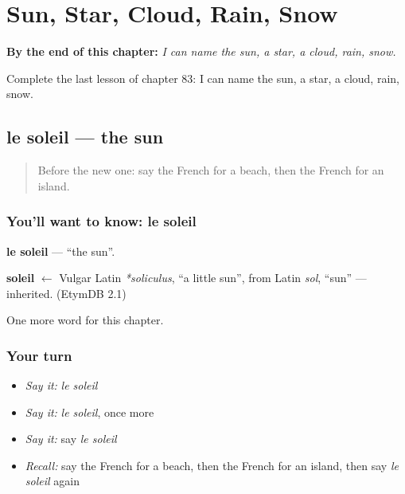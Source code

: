 
\chapter{Sun, Star, Cloud, Rain, Snow}
\label{ch:fr-sun-star-cloud-rain-snow}

\begin{chapteropening}
\textbf{By the end of this chapter:} \emph{I can name the sun, a star, a cloud, rain, snow.}

Complete the last lesson of chapter 83: I can name the sun, a star, a cloud, rain, snow.
\end{chapteropening}

\section[le soleil]{le soleil — the sun}

\label{lesson:FR-C83-soleil}



\begin{quote}
Before the new one: say the French for a beach, then the French for an island.
\end{quote}

\subsection*{You'll want to know: le soleil}
\textbf{le soleil} — \textquotedblleft{}the sun\textquotedblright{}.

\begin{cousinweb}
\textbf{soleil} $\leftarrow$ Vulgar Latin \emph{*soliculus}, \textquotedblleft{}a little sun\textquotedblright{}, from Latin \emph{sol}, \textquotedblleft{}sun\textquotedblright{} — inherited. (EtymDB 2.1)
\end{cousinweb}

\begin{grammarlens}[title={What you've built}]
One more word for this chapter.
\end{grammarlens}

\subsection*{Your turn}
\begin{itemize}
\raggedright
  \item \emph{Say it:} \emph{le soleil}
  \item \emph{Say it:} \emph{le soleil}, once more
  \item \emph{Say it:} say \emph{le soleil}
  \item \emph{Recall:} say the French for a beach, then the French for an island, then say \emph{le soleil} again
\end{itemize}


